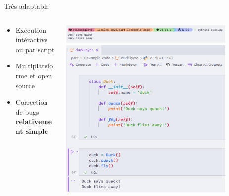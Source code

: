 \begin{frame}{Très adaptable}
  \begin{columns}[T]
    \begin{column}{.4\textwidth}
      \begin{block}{}
        \begin{itemize}
          \item<+-> Exécution intéractive ou par script
          \item<+-> Multiplateforme et open source
          \item<+-> Correction de bugs \textbf{relativement simple}
        \end{itemize}
      \end{block}
    \end{column}%
    \hfill
    \begin{column}{.6\textwidth}
      \includegraphics[width=0.85\textwidth]{img/duck_terminal}\\[1ex]
      \includegraphics[width=0.85\textwidth]{img/duck_jupyter}
    \end{column}%
  \end{columns}

\end{frame}



